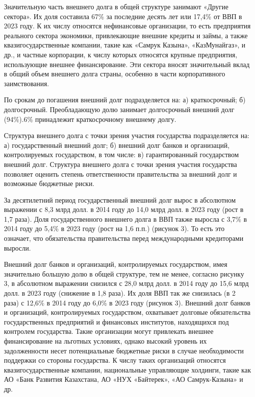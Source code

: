 \begin{multicols}{2}
Значительную часть внешнего долга в общей структуре занимают «Другие
сектора». Их доля составила 67\% за последние десять лет или 17,4\% от
ВВП в 2023 году. К их числу относятся нефинансовые организации, то есть
предприятия реального сектора экономики, привлекающие внешние кредиты и
займы, а также квазигосударственные компании, такие как «Самрук Казына»,
«КазМунайгаз», и др., и частные корпорации, к числу которых относятся
крупные предприятия, использующие внешнее финансирование. Эти сектора
вносят значительный вклад в общий объем внешнего долга страны, особенно
в части корпоративного заимствования.

По срокам до погашения внешний долг подразделяется на: а) краткосрочный;
б) долгосрочный. Преобладающую долю занимает долгосрочный внешний долг
(94\%).6\% принадлежит краткосрочному внешнему долгу.

Структура внешнего долга с точки зрения участия государства
подразделяется на: а) государственный внешний долг; б) внешний долг
банков и организаций, контролируемых государством, в том числе: в)
гарантированный государством внешний долг. Структура внешнего долга с
точки зрения участия государства позволяет оценить степень
ответственности правительства за внешний долг и возможные бюджетные
риски.

За десятилетний период государственный внешний долг вырос в абсолютном
выражении с 8,3 млрд долл. в 2014 году до 14,0 млрд долл. в 2023 году
(рост в 1,7 раза). Доля государственного внешнего долга в ВВП также
выросла с 3,7\% в 2014 году до 5,4\% в 2023 году (рост на 1,6 п.п.)
(рисунок 3). То есть это означает, что обязательства правительства перед
международными кредиторами выросли.

Внешний долг банков и организаций, контролируемых государством, имея
значительно большую долю в общей структуре, тем не менее, согласно
рисунку 3, в абсолютном выражении снизился с 28,0 млрд долл. в 2014 году
до 15,6 млрд долл. в 2023 году (снижение в 1,8 раза). Их доля ВВП так же
снизилась (в 2 раза) с 12,6\% в 2014 году до 6,0\% в 2023 году (рисунок
3). Внешний долг банков и организаций, контролируемых государством,
охватывает долговые обязательства государственных предприятий и
финансовых институтов, находящихся под контролем государства. Такие
организации могут привлекать внешнее финансирование на льготных
условиях, однако высокий уровень их задолженности несет потенциальные
бюджетные риски в случае необходимости поддержки со стороны государства.
К числу таких организаций относятся квазигосударственные компании,
национальные управляющие холдинги, такие как АО «Банк Развития
Казахстана, АО «НУХ «Байтерек», «АО Самрук-Казына» и др.
\end{multicols}

